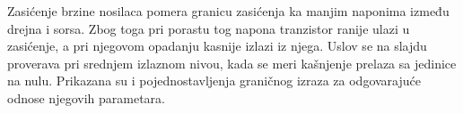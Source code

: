 Zasićenje brzine nosilaca pomera granicu zasićenja ka manjim naponima između drejna i sorsa. Zbog toga pri porastu tog napona tranzistor ranije ulazi u zasićenje, a pri njegovom opadanju kasnije izlazi iz njega. Uslov se na slajdu proverava pri srednjem izlaznom nivou, kada se meri kašnjenje prelaza sa jedinice na nulu. Prikazana su i pojednostavljenja graničnog izraza za odgovarajuće odnose njegovih parametara.
